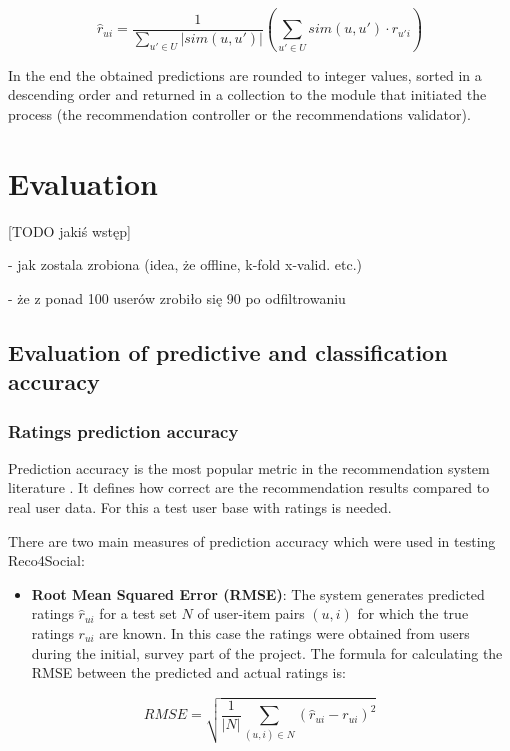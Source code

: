 \documentclass[12pt]{report}
\begin{document}
\begin{equation}
\hat{r}_{ui} = \frac{1}{\displaystyle\sum_{u' \in U} |sim(u,u')|} \left(\displaystyle\sum_{u' \in U} sim(u,u')\cdot r_{u'i}\right)
\label{eq.ratings_weighted}
\end{equation}

In the end the obtained predictions are rounded to integer values, sorted in a descending order and returned in a collection to the module that initiated the process (the recommendation controller or the recommendations validator).

\chapter{Evaluation}

[TODO jakiś wstęp]

- jak zostala zrobiona (idea, że offline, k-fold x-valid. etc.)

- że z ponad 100 userów zrobiło się 90 po odfiltrowaniu

\section{Evaluation of predictive and classification accuracy}

\subsection{Ratings prediction accuracy}

Prediction accuracy is the most popular metric in the recommendation system literature \cite{eval_microsoft}. It defines how correct are the recommendation results compared to real user data. For this a test user base with ratings is needed. 

There are two main measures of prediction accuracy which were used in testing Reco4Social:
\begin{itemize}
\item {\bf Root Mean Squared Error (RMSE)}: The system generates predicted ratings $\hat{r}_{ui}$ for a test set $N$ of user-item pairs $(u,i)$ for which the true ratings $r_{ui}$ are known. In this case the ratings were obtained from users during the initial, survey part of the project. The formula for calculating the RMSE between the predicted and actual ratings is:
\end{itemize}

\begin{equation}
RMSE = \sqrt{\frac{1}{|N|} \displaystyle\sum_{(u,i) \in N} (\hat{r}_{ui} - r_{ui})^2 }
\label{eq.rmse}
\end{equation}
\hbox{}
\end{document}
